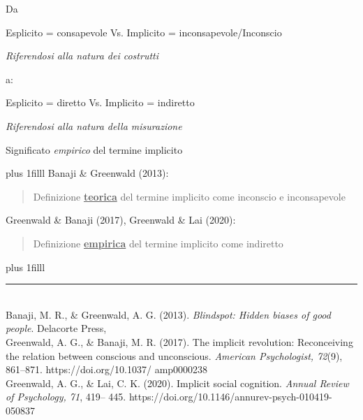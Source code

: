 \documentclass[compress]{beamer}
\begin{document}
\begin{frame}
	
	\begin{center}
		Da
		
		\vspace{3.5mm}
		Esplicito = consapevole Vs. Implicito = inconsapevole/Inconscio  
		
		\emph{Riferendosi alla natura dei costrutti}
		\vspace{3.5mm}
		
		a:
		
		\vspace{3.5mm}
		Esplicito = diretto Vs. Implicito = indiretto 
		
		\emph{Riferendosi alla natura della misurazione}
	\end{center}
	
	\vspace{3.5mm}
	Significato \emph{empirico} del termine implicito
\end{frame}

\begin{frame}
	\vskip0pt plus 1filll
	Banaji \& Greenwald (2013): 
	
	\vspace{5mm}
	\begin{quote}
		Definizione \underline{\textbf{teorica}} del termine implicito come inconscio e inconsapevole
	\end{quote}
	
	\vspace{5mm}
	Greenwald \& Banaji (2017), Greenwald \& Lai (2020): 
	
	\vspace{5mm}
	\begin{quote}
		
		Definizione \underline{\textbf{empirica}} del termine implicito come indiretto 
		
	\end{quote}
	\vskip0pt plus 1filll
	
	\color{template}\rule{0.30\linewidth}{0.5pt}\\
	\color{black}
	\scriptsize{Banaji, M. R., \& Greenwald, A. G. (2013). \emph{Blindspot:
			Hidden biases of good people}. Delacorte Press,\\ 
		Greenwald, A. G., \& Banaji, M. R. (2017). The
		implicit revolution: Reconceiving the relation
		between conscious and unconscious. \emph{American Psychologist, 72}(9), 861–871. https://doi.org/10.1037/
		amp0000238\\
		Greenwald, A. G., \& Lai, C. K. (2020). Implicit social
		cognition. \emph{Annual Review of Psychology, 71}, 419–
		445. https://doi.org/10.1146/annurev-psych-010419-
		050837
	}
\end{frame}
\end{document}

